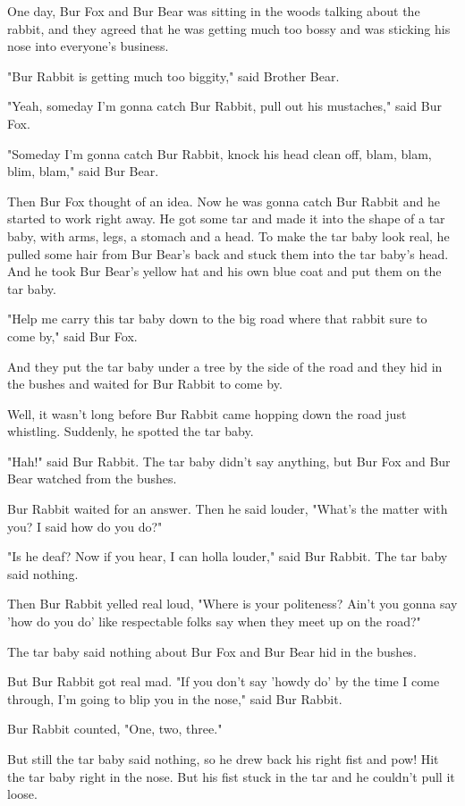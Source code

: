 One day, Bur Fox and Bur Bear was sitting in the woods talking about the rabbit, and they agreed that he was getting much too bossy and was sticking his nose into everyone's business.

"Bur Rabbit is getting much too biggity," said Brother Bear.

"Yeah, someday I'm gonna catch Bur Rabbit, pull out his mustaches," said Bur Fox.

"Someday I'm gonna catch Bur Rabbit, knock his head clean off, blam, blam, blim, blam," said Bur Bear.

Then Bur Fox thought of an idea. Now he was gonna catch Bur Rabbit and he started to work right away. He got some tar and made it into the shape of a tar baby, with arms, legs, a stomach and a head. To make the tar baby look real, he pulled some hair from Bur Bear's back and stuck them into the tar baby's head. And he took Bur Bear's yellow hat and his own blue coat and put them on the tar baby.

"Help me carry this tar baby down to the big road where that rabbit sure to come by," said Bur Fox.

And they put the tar baby under a tree by the side of the road and they hid in the bushes and waited for Bur Rabbit to come by.

Well, it wasn't long before Bur Rabbit came hopping down the road just whistling. Suddenly, he spotted the tar baby.

"Hah!" said Bur Rabbit. The tar baby didn't say anything, but Bur Fox and Bur Bear watched from the bushes.

Bur Rabbit waited for an answer. Then he said louder, "What's the matter with you? I said how do you do?"

"Is he deaf? Now if you hear, I can holla louder," said Bur Rabbit. The tar baby said nothing.

Then Bur Rabbit yelled real loud, "Where is your politeness? Ain't you gonna say 'how do you do' like respectable folks say when they meet up on the road?"

The tar baby said nothing about Bur Fox and Bur Bear hid in the bushes.

But Bur Rabbit got real mad. "If you don't say 'howdy do' by the time I come through, I'm going to blip you in the nose," said Bur Rabbit.

Bur Rabbit counted, "One, two, three."

But still the tar baby said nothing, so he drew back his right fist and pow! Hit the tar baby right in the nose. But his fist stuck in the tar and he couldn't pull it loose.

